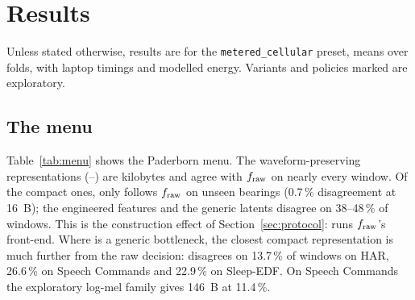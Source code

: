 \section{Results}
\label{sec:results}

Unless stated otherwise, results are for the \texttt{metered\_cellular} preset, means over folds,
with laptop timings and modelled energy. Variants and policies marked \expl{} are exploratory.

\subsection{The menu}
\label{sec:res-menu}

Table~\ref{tab:menu} shows the Paderborn menu. The waveform-preserving representations
(--) are kilobytes and agree with $f_{\mathrm{raw}}$ on nearly every window. Of the compact
ones, only  follows $f_{\mathrm{raw}}$ on unseen bearings (0.7\,\% disagreement at 16~B); the
engineered features and the generic latents disagree on 38--48\,\% of windows. This is the
construction effect of Section~\ref{sec:protocol}:  runs $f_{\mathrm{raw}}$'s front-end.
Where  is a generic bottleneck, the closest compact representation is much further from
the raw decision:  disagrees on 13.7\,\% of windows on HAR, 26.6\,\% on Speech Commands and
22.9\,\% on Sleep-EDF. On Speech Commands the exploratory log-mel family\expl{} gives 146~B at
11.4\,\%.

